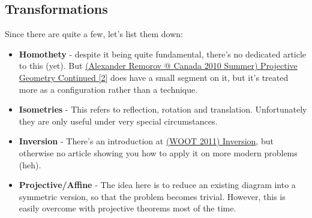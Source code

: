 	\subsection{Transformations}
	Since there are quite a few, let's list them down:
	\begin{itemize}
	\item \textbf{Homothety} - despite it being quite fundamental, there's no dedicated article to this (yet). But \href{run:./F_geometry/(Alexander Remorov @ Canada 2010 Summer) Projective Geometry Continued.pdf}{(Alexander Remorov @ Canada 2010 Summer) Projective Geometry Continued [2]} does have a small segment on it, but it's treated more as a configuration rather than a technique.
	\item \textbf{Isometries} - This refers to reflection, rotation and translation. Unfortunately they are only useful under very special circumstances. %
	\item \textbf{Inversion} - There's an introduction at \href{run:./F_geometry/(WOOT 2011) Inversion.pdf}{(WOOT 2011) Inversion}, but otherwise no article showing you how to apply it on more modern problems (heh).
	\item \textbf{Projective/Affine} - The idea here is to reduce an existing diagram into a symmetric version, so that the problem becomes trivial. However, this is easily overcome with projective theorems most of the time.
	\end{itemize}
